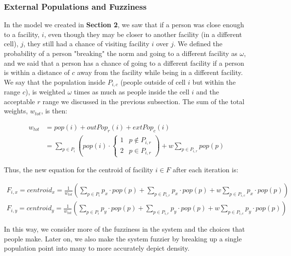 \documentclass{article}
\begin{document}
\subsubsection*{External Populations and Fuzziness}

In the model we created in \textbf{Section 2}, we saw that if a person was close enough to a facility, $i$, even though they may be closer to another facility (in a different cell), $j$, they still had a chance of visiting facility $i$ over $j$. We defined the probability of a person "breaking" the norm and going to a different facility as $\omega$, and we said that a person has a chance of going to a different facility if a person is within a distance of $c$ away from the facility while being in a different facility. We say that the population inside $P_{i, c}$ (people outside of cell $i$ but within the range $c$), is weighted $\omega$ times as much as people inside the cell $i$ and the acceptable $r$ range we discussed in the previous subsection. The sum of the total weights, $w_{tot}$, is then:

\begin{align*}
    w_{tot} &= pop(i) + outPop_r (i) + extPop_c(i) \\
            &= \sum_{p \in P_i} \left( pop(i) \cdot \begin{cases}
                 1 & p \notin P_{i, r} \\
                 2 & p \in P_{i, r} 
                \end{cases}
            \right) + w\sum_{p \in P_{i, r}} pop(p)
\end{align*}

Thus, the new equation for the centroid of facility $i \in F$ after each iteration is:

\begin{gather}
F_{i, x} = centroid_x = \frac{1}{w_{tot}} \left( \sum_{p \in P_i} p_x \cdot pop(p) + \sum_{p \in P_{i, r}} p_x \cdot pop(p) + w\sum_{p \in P_{i, c}} p_x \cdot pop (p) \right)\\
F_{i, y} = centroid_y = \frac{1}{w_{tot}} \left( \sum_{p \in P_i} p_y \cdot pop(p) + \sum_{p \in P_{i, r}} p_y \cdot pop(p) + w\sum_{p \in P_{i, c}} p_y \cdot pop (p) \right)
\end{gather}

In this way, we consider more of the fuzziness in the system and the choices that people make. Later on, we also make the system fuzzier by breaking up a single population point into many to more accurately depict density.
\end{document}
